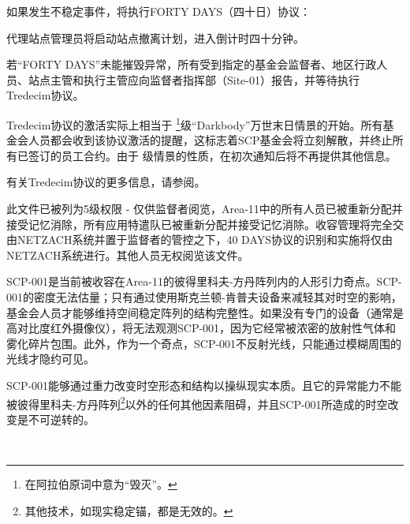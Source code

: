 如果发生不稳定事件，将执行FORTY DAYS（四十日）协议：

代理站点管理员将启动站点撤离计划，进入倒计时四十分钟。







若“FORTY DAYS”未能摧毁异常，所有受到指定的基金会监督者、地区行政人员、站点主管和执行主管应向监督者指挥部（Site-01）报告，并等待执行Tredecim协议。

\hr

Tredecim协议的激活实际上相当于
\footnote{在阿拉伯原词中意为“毁灭”。}级“Darkbody”万世末日情景的开始。所有基金会人员都会收到该协议激活的提醒，这标志着SCP基金会将立刻解散，并终止所有已签订的员工合约。由于
级情景的性质，在初次通知后将不再提供其他信息。

有关Tredecim协议的更多信息，请参阅。

此文件已被列为5级权限 - 仅供监督者阅览，Area-11中的所有人员已被重新分配并接受记忆消除，所有应用特遣队已被重新分配并接受记忆消除。收容管理将完全交由NETZACH系统并置于监督者的管控之下，40 DAYS协议的识别和实施将仅由NETZACH系统进行。其他人员无权阅览该文件。

SCP-001是当前被收容在Area-11的彼得里科夫-方丹阵列内的人形引力奇点。SCP-001的密度无法估量；只有通过使用斯克兰顿-肯普夫设备来减轻其对时空的影响，基金会人员才能够维持空间稳定阵列的结构完整性。如果没有专门的设备（通常是高对比度红外摄像仪），将无法观测SCP-001，因为它经常被浓密的放射性气体和雾化碎片包围。此外，作为一个奇点，SCP-001不反射光线，只能通过模糊周围的光线才隐约可见。

SCP-001能够通过重力改变时空形态和结构以操纵现实本质。且它的异常能力不能被彼得里科夫-方丹阵列\footnote{其他技术，如现实稳定锚，都是无效的。}以外的任何其他因素阻碍，并且SCP-001所造成的时空改变是不可逆转的。

\newpage

\begin{center}

\hr

\\

\hr

\end{center}


